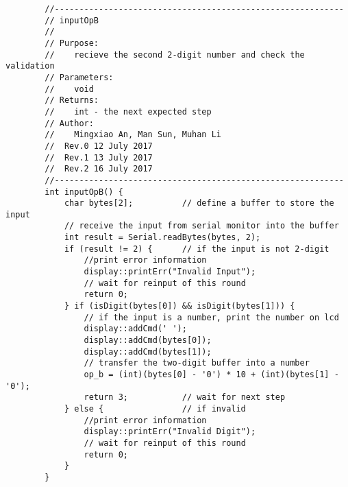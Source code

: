 \begin{verbatim}
        //-----------------------------------------------------------  
        // inputOpB 
        //  
        // Purpose:  
        //    recieve the second 2-digit number and check the validation
        // Parameters:  
        //    void 
        // Returns:  
        //    int - the next expected step   
        // Author:  
        //    Mingxiao An, Man Sun, Muhan Li
        //  Rev.0 12 July 2017
        //  Rev.1 13 July 2017
        //  Rev.2 16 July 2017
        //-----------------------------------------------------------
        int inputOpB() {
            char bytes[2];          // define a buffer to store the input
            // receive the input from serial monitor into the buffer    
            int result = Serial.readBytes(bytes, 2);
            if (result != 2) {      // if the input is not 2-digit
                //print error information
                display::printErr("Invalid Input");
                // wait for reinput of this round
                return 0;
            } if (isDigit(bytes[0]) && isDigit(bytes[1])) {
                // if the input is a number, print the number on lcd
                display::addCmd(' ');
                display::addCmd(bytes[0]);
                display::addCmd(bytes[1]);
                // transfer the two-digit buffer into a number
                op_b = (int)(bytes[0] - '0') * 10 + (int)(bytes[1] - '0');
                return 3;           // wait for next step
            } else {                // if invalid
                //print error information
                display::printErr("Invalid Digit");
                // wait for reinput of this round
                return 0;
            }
        }


\end{verbatim}
